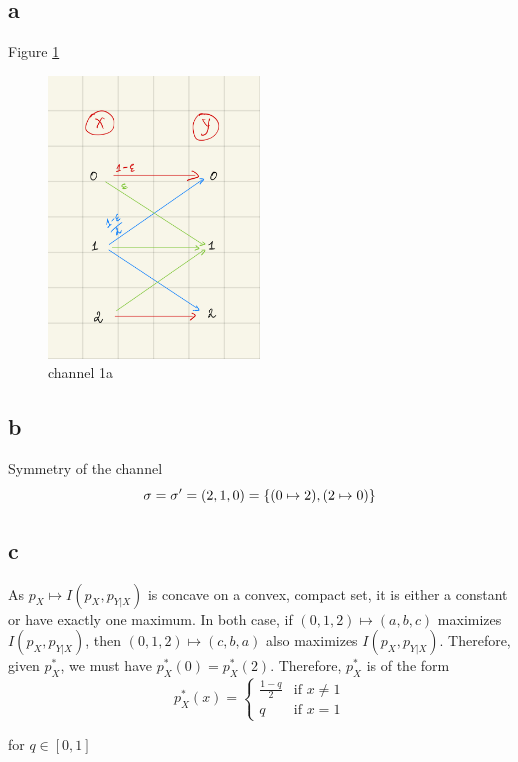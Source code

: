 \documentclass{article}
\begin{document}
\subsection{a}

Figure \ref{fig_channel_1a}

\begin{figure}[h]
\centering
\includegraphics[width=0.5\textwidth]{1a.jpg}
\caption{channel 1a}
\label{fig_channel_1a}
\end{figure}

\subsection{b}

Symmetry of the channel
$$
    \sigma = \sigma' = (2, 1, 0) = \{(0 \mapsto 2), (2 \mapsto 0)\}
$$
\subsection{c}

As $p_X \mapsto I(p_X, p_{Y|X})$ is concave on a convex, compact set, it is either a constant or have exactly one maximum. In both case, if $(0, 1, 2) \mapsto (a, b, c)$ maximizes $I(p_X, p_{Y|X})$, then $(0, 1, 2) \mapsto (c, b, a)$ also maximizes $I(p_X, p_{Y|X})$. Therefore, given $p_X^*$, we must have $p_X^*(0) = p_X^*(2)$. Therefore, $p_X^*$ is of the form
$$
    p_X^*(x) = \begin{cases}
    \frac{1-q}{2} &\text{if $x \neq 1$} \\
    q &\text{if $x = 1$}
    \end{cases}
$$

for $q \in [0, 1]$
\end{document}
